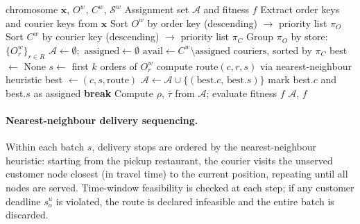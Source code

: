 \begin{algorithm}[ht]
\caption{Chromosome Decoder for window $w$}
\label{alg:decoder}
\begin{algorithmic}[1]
\Require chromosome $\mathbf{x}$, $O^w$, $C^w$, $\mathcal{S}^w$
\Ensure Assignment set $\mathcal{A}$ and fitness $f$
\State Extract order keys and courier keys from $\mathbf{x}$
\State Sort $O^w$ by order key (descending) $\rightarrow$ priority list $\pi_O$
\State Sort $C^w$ by courier key (descending) $\rightarrow$ priority list $\pi_C$
\State Group $\pi_O$ by store: $\{O^w_r\}_{r \in R}$
\State $\mathcal{A} \leftarrow \emptyset$;\ $\text{assigned} \leftarrow \emptyset$
    \State $\text{avail} \leftarrow C^w \setminus \text{assigned couriers}$, sorted by $\pi_C$
        \State best $\leftarrow$ None
            \State $s \leftarrow$ first $k$ orders of $O^w_r$
                \State compute route$(c, r, s)$ via nearest-neighbour heuristic
                    \State best $\leftarrow (c, s, \text{route})$
                \EndIf
            \EndFor
        \EndFor
            \State $\mathcal{A} \leftarrow \mathcal{A} \cup \{(\text{best}.c,\,\text{best}.s)\}$
            \State mark best$.c$ and best$.s$ as assigned
        \Else
            \State \textbf{break}
        \EndIf
    \EndWhile
\EndFor
\State Compute $\rho$, $\bar{\tau}$ from $\mathcal{A}$; evaluate fitness $f$
\State \Return $\mathcal{A}$, $f$
\end{algorithmic}
\end{algorithm}

\paragraph{Nearest-neighbour delivery sequencing.}
Within each batch $s$, delivery stops are ordered by the
nearest-neighbour heuristic: starting from the pickup restaurant,
the courier visits the unserved customer node closest (in travel
time) to the current position, repeating until all nodes are
served.
Time-window feasibility is checked at each step;
if any customer deadline $s^u_o$ is violated, the route is
declared infeasible and the entire batch is discarded.

